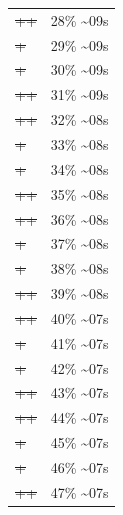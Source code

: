 \documentclass[12pt]{article}
\begin{document}
\begin{center}
\begin{tabular}{ll}
\sout{\sout{\sout{\sout{\sout{\sout{++}}}}}} & 28\% \textasciitilde{}09s\\
\sout{\sout{\sout{\sout{\sout{\sout{\sout{+}}}}}}} & 29\% \textasciitilde{}09s\\
\sout{\sout{\sout{\sout{\sout{\sout{\sout{+}}}}}}} & 30\% \textasciitilde{}09s\\
\sout{\sout{\sout{\sout{\sout{\sout{\sout{++}}}}}}} & 31\% \textasciitilde{}09s\\
\sout{\sout{\sout{\sout{\sout{\sout{\sout{++}}}}}}} & 32\% \textasciitilde{}08s\\
\sout{\sout{\sout{\sout{\sout{\sout{\sout{\sout{+}}}}}}}} & 33\% \textasciitilde{}08s\\
\sout{\sout{\sout{\sout{\sout{\sout{\sout{\sout{+}}}}}}}} & 34\% \textasciitilde{}08s\\
\sout{\sout{\sout{\sout{\sout{\sout{\sout{\sout{++}}}}}}}} & 35\% \textasciitilde{}08s\\
\sout{\sout{\sout{\sout{\sout{\sout{\sout{\sout{++}}}}}}}} & 36\% \textasciitilde{}08s\\
\sout{\sout{\sout{\sout{\sout{\sout{\sout{\sout{\sout{+}}}}}}}}} & 37\% \textasciitilde{}08s\\
\sout{\sout{\sout{\sout{\sout{\sout{\sout{\sout{\sout{+}}}}}}}}} & 38\% \textasciitilde{}08s\\
\sout{\sout{\sout{\sout{\sout{\sout{\sout{\sout{\sout{++}}}}}}}}} & 39\% \textasciitilde{}08s\\
\sout{\sout{\sout{\sout{\sout{\sout{\sout{\sout{\sout{++}}}}}}}}} & 40\% \textasciitilde{}07s\\
\sout{\sout{\sout{\sout{\sout{\sout{\sout{\sout{\sout{\sout{+}}}}}}}}}} & 41\% \textasciitilde{}07s\\
\sout{\sout{\sout{\sout{\sout{\sout{\sout{\sout{\sout{\sout{+}}}}}}}}}} & 42\% \textasciitilde{}07s\\
\sout{\sout{\sout{\sout{\sout{\sout{\sout{\sout{\sout{\sout{++}}}}}}}}}} & 43\% \textasciitilde{}07s\\
\sout{\sout{\sout{\sout{\sout{\sout{\sout{\sout{\sout{\sout{++}}}}}}}}}} & 44\% \textasciitilde{}07s\\
\sout{\sout{\sout{\sout{\sout{\sout{\sout{\sout{\sout{\sout{\sout{+}}}}}}}}}}} & 45\% \textasciitilde{}07s\\
\sout{\sout{\sout{\sout{\sout{\sout{\sout{\sout{\sout{\sout{\sout{+}}}}}}}}}}} & 46\% \textasciitilde{}07s\\
\sout{\sout{\sout{\sout{\sout{\sout{\sout{\sout{\sout{\sout{\sout{++}}}}}}}}}}} & 47\% \textasciitilde{}07s\\

\end{tabular}
\end{center}
\end{document}
